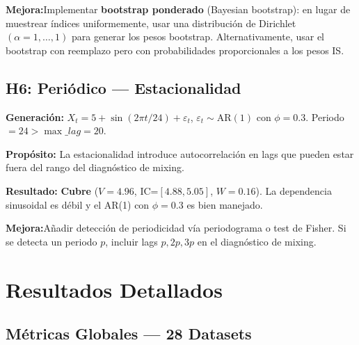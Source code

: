 \documentclass[12pt,a4paper]{article}
\newcommand{\ok}{\textcolor{cbgreen}{\checkmark}}
\newcommand{\mejora}{\textbf{Mejora:}}
\begin{document}
\mejora Implementar \textbf{bootstrap ponderado} (Bayesian bootstrap): en lugar de muestrear índices uniformemente, usar una distribución de Dirichlet$(\alpha=1,\dots,1)$ para generar los pesos bootstrap. Alternativamente, usar el bootstrap con reemplazo pero con probabilidades proporcionales a los pesos IS.

\subsection{H6: Periódico — Estacionalidad}

\textbf{Generación:} $X_t = 5 + \sin(2\pi t/24) + \varepsilon_t$, $\varepsilon_t \sim \text{AR}(1)$ con $\phi=0.3$. Periodo $=24 > \max\_lag=20$.

\textbf{Propósito:} La estacionalidad introduce autocorrelación en lags que pueden estar fuera del rango del diagnóstico de mixing.

\textbf{Resultado:} \ok \textbf{Cubre} ($V=4.96$, IC=$[4.88,5.05]$, $W=0.16$). La dependencia sinusoidal es débil y el AR(1) con $\phi=0.3$ es bien manejado.

\mejora Añadir detección de periodicidad vía periodograma o test de Fisher. Si se detecta un periodo $p$, incluir lags $p, 2p, 3p$ en el diagnóstico de mixing.

\newpage

\section{Resultados Detallados}

\subsection{Métricas Globales — 28 Datasets}
\end{document}
